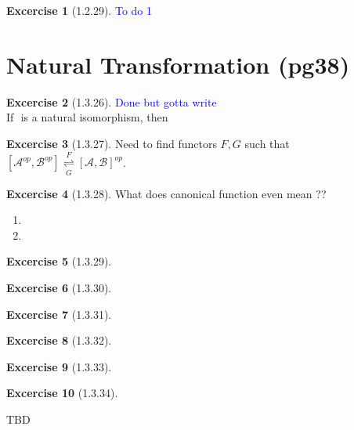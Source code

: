 \documentclass{article}
\theoremstyle{definition}
\newtheorem*{excercise}{Excercise}
\begin{document}
\begin{excercise}[1.2.29] %
		\item \textcolor{blue}{To do 1}
\end{excercise}

\section{Natural Transformation (pg38)}

\begin{excercise}[1.3.26] %
	\textcolor{blue}{Done but gotta write}\\
	If $ $ is a natural isomorphism, then

\end{excercise}

\begin{excercise}[1.3.27] %
Need to find functors $F,G$  such that
$[\mathcal{A}^{op},\mathcal{B}^{op}] \overset{F}{\underset{G}{\rightleftharpoons}}[ \mathcal{A} ,\mathcal{B} ]^{op} $.

\end{excercise}

\begin{excercise}[1.3.28] %
	What does canonical function even mean ??

		\begin{enumerate}[label=(\alph*)]
			\item
			\item
		\end{enumerate}

\end{excercise}

\begin{excercise}[1.3.29] %


\end{excercise}

\begin{excercise}[1.3.30] %

\end{excercise}

\begin{excercise}[1.3.31] %

\end{excercise}

\begin{excercise}[1.3.32] %

\end{excercise}

\begin{excercise}[1.3.33] %

\end{excercise}

\begin{excercise}[1.3.34] %

\end{excercise}




\pagebreak
TBD
\end{document}
